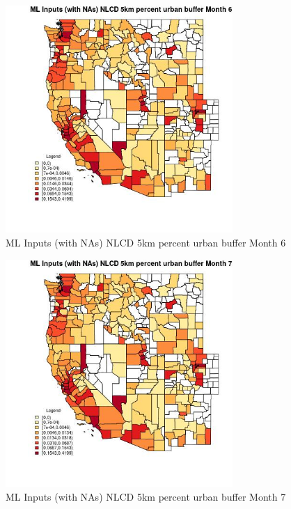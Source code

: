 \begin{figure} 
\centering  
\includegraphics[width=0.77\textwidth]{Code_Outputs/Report_ML_input_PM25_Step4_part_f_de_duplicated_aves_prioritize_24hr_obswNAs_CountyNLCD_5km_percent_urban_buffermedianMonth6.jpg} 
\caption{\label{fig:Report_ML_input_PM25_Step4_part_f_de_duplicated_aves_prioritize_24hr_obswNAsCountyNLCD_5km_percent_urban_buffermedianMonth6}ML Inputs (with NAs) NLCD 5km percent urban buffer Month 6} 
\end{figure} 
 

\begin{figure} 
\centering  
\includegraphics[width=0.77\textwidth]{Code_Outputs/Report_ML_input_PM25_Step4_part_f_de_duplicated_aves_prioritize_24hr_obswNAs_CountyNLCD_5km_percent_urban_buffermedianMonth7.jpg} 
\caption{\label{fig:Report_ML_input_PM25_Step4_part_f_de_duplicated_aves_prioritize_24hr_obswNAsCountyNLCD_5km_percent_urban_buffermedianMonth7}ML Inputs (with NAs) NLCD 5km percent urban buffer Month 7} 
\end{figure} 
 


